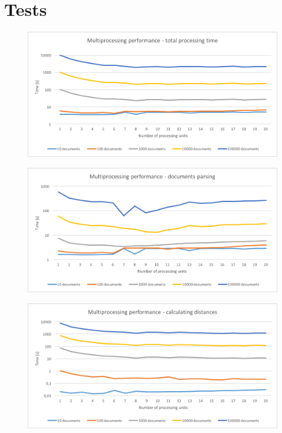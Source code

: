 \chapter{Tests}
\label{tests}

\begin{figure}[ht]
\begin{center}
 \includegraphics[width=0.9\linewidth]{images/tests/mp-total-sum.png}
 \caption{ }
 \label{mp-total-sum}
 \end{center}
 \end{figure}
 
\begin{figure}[ht]
\begin{center}
 \includegraphics[width=0.9\linewidth]{images/tests/mp-doc-parsing.png}
 \caption{ }
 \label{mp-doc-parsing}
 \end{center}
 \end{figure}
 
 \begin{figure}[ht]
\begin{center}
 \includegraphics[width=0.9\linewidth]{images/tests/mp-distances.png}
 \caption{ }
 \label{mp-distances}
 \end{center}
 \end{figure}
 
